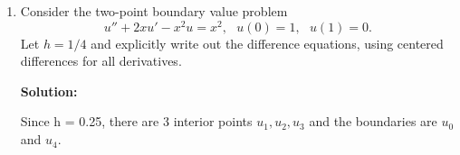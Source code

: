 \documentclass[letterpaper,12pt]{article}
\begin{document}
\begin{enumerate}
{\bf Solution:}

\[Bu(x+h) = Bu(x) +Bhu'(x) +B\frac{1}{2}h^2u''(x) +B\frac{1}{6}h^3u'''(x)+ BO(h^4) \]
\[Cu(x+2h) = Cu(x) +2Chu'(x) +4C\frac{1}{2}h^2u''(x) +8C\frac{1}{6}h^3u'''(x)+ CO(h^4) \]

Thus, we can easily see that to get rid of u(x) and u'(x), we need
\[A=-B-C, B=-2C\]
But we cannot get rid of u'''(x) term.
\[
u'' (x) \approx  C h^2u''(x) +Ch^3u'''(x)+ (B+C)O(h^4)
\]
Thus, C = $\frac{1}{h^2}$

So,
\[
u'' (x) \approx  u''(x) + hu'''(x)+ O(h^2)
\]
This is first order.
\[C = \frac{1}{h^2}, B = -\frac{2}{h^2}, A = \frac{1}{h^2}\]
\item
Consider the two-point boundary value problem
\[ 
u'' + 2xu' - x^2 u = x^2 ,~~~u(0)=1,~~~u(1) = 0 .
\]
Let $h=1/4$ and explicitly write out the difference equations,
using centered differences for all derivatives.

{\bf Solution:}

Since h = 0.25, there are 3 interior points $u_1,u_2,u_3$ and the boundaries are $u_0$ and $u_4$.


\end{enumerate}
\end{document}
